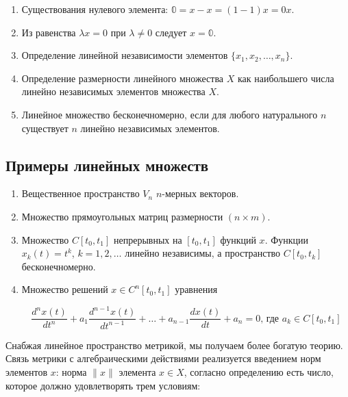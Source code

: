 \documentclass[12pt,a4paper,titlepage,oneside]{book}
\theoremstyle{definition}
\theoremstyle{plain}
\theoremstyle{break}
\theoremstyle{remark}
\theoremstyle{remark}
\theoremstyle{remark}
\theoremstyle{remark}
\theoremstyle{plain}
\theoremstyle{plain}
\begin{document}
\begin{enumerate}

	\item Существования нулевого элемента: $\mathbb{0}=x-x=(1-1)x=0x$.

	\item Из равенства $\lambda x=0$ при $\lambda\ne0$ следует $x=\mathbb{0}$.

	\item Определение линейной независимости элементов $\{x_1,x_2, \ldots, x_n\}$.

	\item Определение размерности линейного множества $X$ как наибольшего числа линейно независимых элементов множества $X$.

	\item Линейное множество бесконечномерно, если для любого натурального $n$ существует $n$ линейно независимых элементов.

\end{enumerate}

\subsection*{Примеры линейных множеств}

\begin{enumerate}

	\item Вещественное пространство $V_n$ $n$-мерных векторов.

	\item Множество прямоугольных матриц размерности $(n\times m)$.

	\item Множество $C[t_0,t_1]$ непрерывных на $[t_0,t_1]$ функций $x$. Функции $x_k(t)=t^k$, $k=1,2,\ldots$ линейно независимы, а пространство $C[t_0,t_k]$ бесконечномерно.

	\item Множество решений $x\in C^n[t_0,t_1]$ уравнения

	\begin{equation*}
	\frac{d^nx(t)}{dt^n}+a_1\frac{d^{n-1}x(t)}{dt^{n-1}}+\ldots+a_{n-1}\frac{dx(t)}{dt}+a_n=0 \mbox{, где } a_k\in C[t_0,t_1]
	\end{equation*}

\end{enumerate}


Снабжая линейное пространство метрикой, мы получаем более богатую теорию. Связь метрики с алгебраическими действиями реализуется введением норм элементов $x$: норма $\lVert x\rVert$ элемента $x\in X$, согласно определению есть число, которое должно удовлетворять трем условиям:
\end{document}
